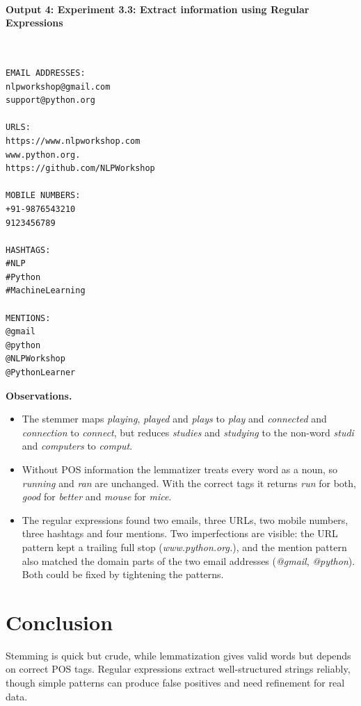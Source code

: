 \documentclass[12pt,a4paper,oneside]{report}
\providecommand{\tightlist}{\setlength{\itemsep}{0pt}\setlength{\parskip}{0pt}}
\begin{document}
\paragraph{Output 4: Experiment 3.3: Extract information using Regular Expressions}\mbox{}\\[-1ex]
\begin{Verbatim}[commandchars=\\\{\},breaklines=true,breakanywhere=true,fontsize=\scriptsize,frame=leftline,framesep=2mm,rulecolor=\color{gray}]
EMAIL ADDRESSES:
nlpworkshop@gmail.com
support@python.org

URLS:
https://www.nlpworkshop.com
www.python.org.
https://github.com/NLPWorkshop

MOBILE NUMBERS:
+91-9876543210
9123456789

HASHTAGS:
#NLP
#Python
#MachineLearning

MENTIONS:
@gmail
@python
@NLPWorkshop
@PythonLearner
\end{Verbatim}
\textbf{Observations.}

\begin{itemize}
\tightlist
\item
  The stemmer maps \emph{playing}, \emph{played} and \emph{plays} to \emph{play} and \emph{connected} and \emph{connection} to \emph{connect}, but reduces \emph{studies} and \emph{studying} to the non-word \emph{studi} and \emph{computers} to \emph{comput}.
\item
  Without POS information the lemmatizer treats every word as a noun, so \emph{running} and \emph{ran} are unchanged. With the correct tags it returns \emph{run} for both, \emph{good} for \emph{better} and \emph{mouse} for \emph{mice}.
\item
  The regular expressions found two emails, three URLs, two mobile numbers, three hashtags and four mentions. Two imperfections are visible: the URL pattern kept a trailing full stop (\emph{www.python.org.}), and the mention pattern also matched the domain parts of the two email addresses (\emph{@gmail}, \emph{@python}). Both could be fixed by tightening the patterns.
\end{itemize}


\section{Conclusion}
Stemming is quick but crude, while lemmatization gives valid words but depends on correct POS tags. Regular expressions extract well-structured strings reliably, though simple patterns can produce false positives and need refinement for real data.
\end{document}
